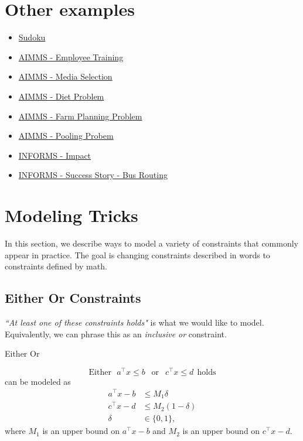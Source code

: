 \section{Other examples}
\begin{itemize}
\item \href{https://www.juliaopt.org/notebooks/JuMP-Sudoku.html}{Sudoku}
\item \href{https://download.aimms.com/aimms/download/manuals/AIMMS3OM_EmployeeTraining.pdf}{AIMMS - Employee Training}

\item \href{https://download.aimms.com/aimms/download/manuals/AIMMS3OM_MediaSelection.pdf}{AIMMS - Media Selection}

\item \href{https://download.aimms.com/aimms/download/manuals/AIMMS3OM_Diet.pdf}{AIMMS - Diet Problem}

\item \href{https://download.aimms.com/aimms/download/manuals/AIMMS3OM_FarmPlanning.pdf}{AIMMS - Farm Planning Problem}

\item \href{https://download.aimms.com/aimms/download/manuals/AIMMS3OM_Pooling.pdf}{AIMMS - Pooling Probem}

\item \href{https://www.informs.org/Impact}{INFORMS - Impact}
\item \href{https://www.informs.org/Impact/O.R.-Analytics-Success-Stories/Optimized-school-bus-routing-helps-school-districts-design-better-policies}{INFORMS - Success Story - Bus Routing}
\end{itemize}
\section{Modeling Tricks}
In this section, we describe ways to model a variety of constraints that commonly appear in practice.  The goal is changing constraints described in words to constraints defined by math.
\subsection{Either Or Constraints}
\emph{``At least one of these constraints holds"} is what we would like to model.  Equivalently, we can phrase this as an \emph{inclusive or} constraint.  
\begin{general}{Either Or}{}{}

\begin{equation}
\text{Either} \ \ \ a^\top x \leq b\ \  \text{  or  } \ \  c^\top x \leq d \ \ \text{holds} 
\end{equation}
can be modeled as 
\begin{equation}
\begin{split}
a^\top x - b &\leq M_1 \delta\\
c^\top x - d &\leq M_2 (1-\delta)\\
\delta &\in \{0,1\},
\end{split}
\end{equation}
where $M_1$ is an upper bound on $a^\top x - b$ and $M_2$ is an upper bound on $c^\top x - d$.
\end{general}


